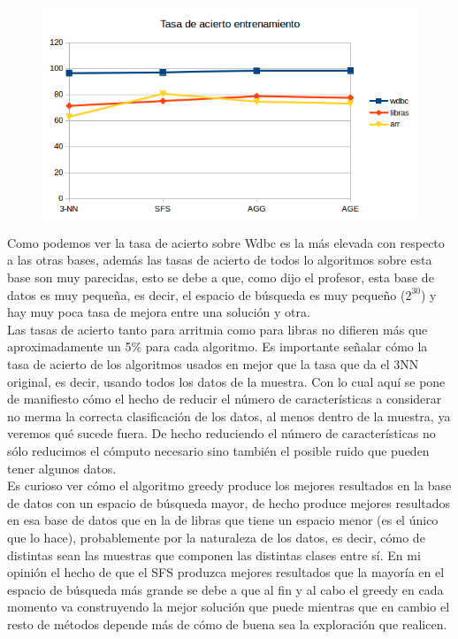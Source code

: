 \documentclass[10pt,a4paper]{article}
\begin{document}
\begin{figure}[H]
\centering
\includegraphics[width=130mm]{tasa_train_ag.png}
\end{figure}

Como podemos ver la tasa de acierto sobre Wdbc es la más elevada con respecto a las otras bases, además las tasas de acierto de todos lo algoritmos sobre esta base son muy parecidas, esto se debe a que, como dijo el profesor, esta base de datos es muy pequeña, es decir, el espacio de búsqueda es muy pequeño ($2^{30}$) y hay muy poca tasa de mejora entre una solución y otra.\\

Las tasas de acierto tanto para arritmia como para libras no difieren más que aproximadamente un 5\% para cada algoritmo. Es importante señalar cómo la tasa de acierto de los algoritmos usados en mejor que la tasa que da el 3NN original, es decir, usando todos los datos de la muestra. Con lo cual aquí se pone de manifiesto cómo el hecho de reducir el número de características a considerar no merma la correcta clasificación de los datos, al menos dentro de la muestra, ya veremos qué sucede fuera. De hecho reduciendo el número de características no sólo reducimos el cómputo necesario sino también el posible ruido que pueden tener algunos datos.\\

Es curioso ver cómo el algoritmo greedy produce los mejores resultados en la base de datos con un espacio de búsqueda mayor, de hecho produce mejores resultados en esa base de datos que en la de libras que tiene un espacio menor (es el único que lo hace), probablemente por la naturaleza de los datos, es decir, cómo de distintas sean las muestras que componen las distintas clases entre sí. En mi opinión el hecho de que el SFS produzca mejores resultados que la mayoría en el espacio de búsqueda más grande se debe a que al fin y al cabo el greedy en cada momento va construyendo la mejor solución que puede mientras que en cambio el resto de métodos depende más de cómo de buena sea la exploración que realicen.\\
\end{document}
